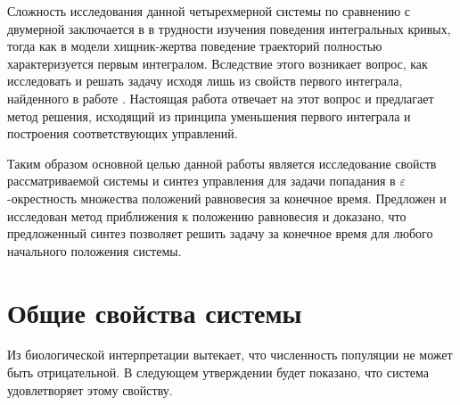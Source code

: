 \documentclass[11pt]{article}
\theoremstyle{definition}
\begin{document}
Сложность исследования данной четырехмерной системы по сравнению с двумерной заключается в в трудности изучения поведения интегральных кривых, тогда как в модели хищник-жертва поведение траекторий полностью характеризуется первым интегралом. Вследствие этого возникает вопрос, как исследовать и решать задачу исходя лишь из свойств первого интеграла, найденного в работе \cite{MathBio}. Настоящая работа отвечает на этот вопрос и предлагает метод решения, исходящий из принципа уменьшения первого интеграла и построения соответствующих управлений.

Таким образом основной целью данной работы является исследование свойств рассматриваемой системы и синтез управления для задачи попадания в $\varepsilon$-окрестность множества положений равновесия за конечное время. Предложен и исследован метод приближения к положению равновесия и доказано, что предложенный синтез позволяет решить задачу за конечное время для любого начального положения системы.

%
%
%

\section{Общие свойства системы}

\indent Из биологической интерпретации вытекает, что численность популяции не может быть отрицательной. В следующем утверждении будет показано, что система удовлетворяет этому свойству.
\end{document}
